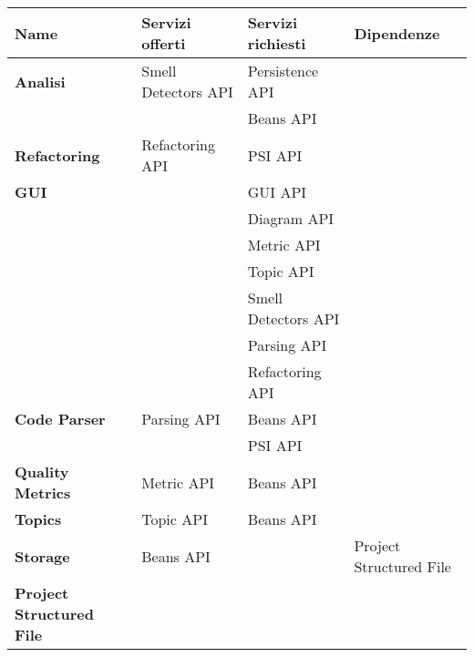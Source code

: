 
\centering

\begin{tabular}{|l|l|l|l|}
	\hline
	\textbf{\Large Name} & \textbf{\Large Servizi offerti} & \textbf{\Large Servizi richiesti} &\textbf{\Large Dipendenze} \rule[-1cm]{0mm}{2cm} \\ \hline
	
	\textbf{Analisi} & Smell Detectors API & Persistence API & \\&& Beans API &  \rule[-0.5cm]{0mm}{0cm}   
	\rule[-0.5cm]{0mm}{0cm}
	\\ \hline
	\textbf{Refactoring} & Refactoring API & PSI API & \rule{0mm}{0.5cm}    
	\rule[-0.5cm]{0mm}{0cm}
	\\ \hline
	\textbf{GUI} & & GUI API & \rule{0mm}{0.5cm}\\&& Diagram API & \\&& Metric API & \\&& Topic API & \\&& Smell Detectors API &
	\\&& Parsing API & \\&& Refactoring API & \rule[-0.5cm]{0mm}{0cm}
	\\ \hline
	\textbf{Code Parser} & Parsing API & Beans API & \rule{0mm}{0.5cm} \\&& PSI API & 
	\rule[-0.5cm]{0mm}{0cm}
	\\ \hline
	\textbf{Quality Metrics} & Metric API & Beans API &  \rule{0mm}{0.5cm} \rule[-0.5cm]{0mm}{0cm}
	\\ \hline
	\textbf{Topics} & Topic API & Beans API & \rule{0mm}{0.5cm} \rule[-0.5cm]{0mm}{0cm}
	\\ \hline
	\textbf{Storage} & Beans API &  & Project Structured File\rule{0mm}{0.5cm} \rule[-0.5cm]{0mm}{0cm}
	\\ \hline
	\textbf{Project Structured File} &  &  & \rule{0mm}{0.5cm} \rule[-0.5cm]{0mm}{0cm}
	\\ \hline
	
\end{tabular}

\flushleft

